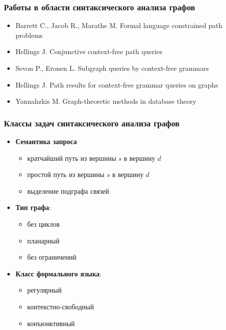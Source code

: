 \documentclass{beamer}
\begin{document}
\begin{frame}[fragile]
	\transwipe[direction=90]
	\frametitle{Работы в области синтаксического анализа графов}
    \begin{itemize}
        \item Barrett C., Jacob R., Marathe M. Formal language constrained path problems
        \item Hellings J. Conjunctive context-free path queries
        \item Sevon P., Eronen L. Subgraph queries by context-free grammars
        \item Hellings J. Path results for context-free grammar queries on graphs
        \item Yannahzkis M. Graph-theoretic methods in database theory
    \end{itemize}   
\end{frame}

\begin{frame}[fragile]
	\transwipe[direction=90]
	\frametitle{Классы задач синтаксического анализа графов}
    \begin{itemize}
        \item \textbf{Семантика запроса}
            \begin{itemize}
                \item кратчайший путь из вершины $s$ в вершину $d$
                \item простой путь из вершины $s$ в вершину $d$
                \item выделение подграфа связей
            \end{itemize}
        \item \textbf{Тип графа}:
            \begin{itemize}
                \item без циклов
                \item планарный
                \item без ограничений
            \end{itemize}
        \item \textbf{Класс формального языка}:
            \begin{itemize}
                \item регулярный
                \item контекстно-свободный
                \item конъюнктивный
            \end{itemize}
    \end{itemize}   
\end{frame}
\end{document}
